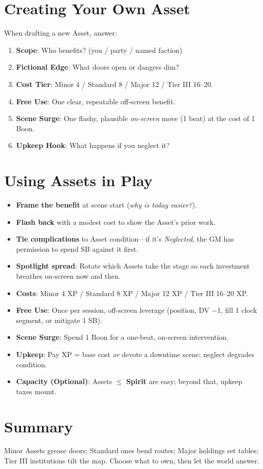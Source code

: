 \section{Creating Your Own Asset}
When drafting a new Asset, answer:
\begin{enumerate}
  \item \textbf{Scope}: Who benefits? (you / party / named faction)
  \item \textbf{Fictional Edge}: What doors open or dangers dim?
  \item \textbf{Cost Tier}: Minor 4 / Standard 8 / Major 12 / Tier III 16–20.
  \item \textbf{Free Use}: One clear, repeatable off-screen benefit.
  \item \textbf{Scene Surge}: One flashy, plausible \emph{on-screen} move (1 beat) at the cost of 1 Boon.
  \item \textbf{Upkeep Hook}: What happens if you neglect it?
\end{enumerate}

\section{Using Assets in Play}
\begin{itemize}
  \item \textbf{Frame the benefit} at scene start (\emph{why is today easier?}).
  \item \textbf{Flash back} with a modest cost to show the Asset's prior work.
  \item \textbf{Tie complications} to Asset condition—if it's \emph{Neglected}, the GM has permission to spend SB against it first.
  \item \textbf{Spotlight spread}: Rotate which Assets take the stage so each investment breathes on-screen now and then.
\end{itemize}

\begin{tcolorbox}[colback=blue!5!white,colframe=blue!75!black,title=Asset Quick Reference,fonttitle=\bfseries]
\begin{itemize}
  \item \textbf{Costs}: Minor 4 XP / Standard 8 XP / Major 12 XP / Tier III 16–20 XP.
  \item \textbf{Free Use}: Once per session, off-screen leverage (position, DV −1, fill 1 clock segment, or mitigate 1 SB).
  \item \textbf{Scene Surge}: Spend 1 Boon for a one-beat, on-screen intervention.
  \item \textbf{Upkeep}: Pay XP = base cost \emph{or} devote a downtime scene; neglect degrades condition.
  \item \textbf{Capacity (Optional)}: Assets $\leq$ \textbf{Spirit} are easy; beyond that, upkeep taxes mount.
\end{itemize}
\end{tcolorbox}

\section{Summary}
Minor Assets grease doors; Standard ones bend routes; Major holdings set tables; Tier III institutions tilt the map. Choose what to own, then let the world answer.